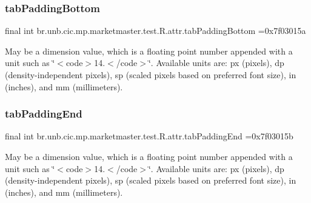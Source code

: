 \subsubsection{\texorpdfstring{tab\+Padding\+Bottom}{tabPaddingBottom}}
{\footnotesize\ttfamily final int br.\+unb.\+cic.\+mp.\+marketmaster.\+test.\+R.\+attr.\+tab\+Padding\+Bottom =0x7f03015a\hspace{0.3cm}{\ttfamily [static]}}

May be a dimension value, which is a floating point number appended with a unit such as \char`\"{}$<$code$>$14.\+5sp$<$/code$>$\char`\"{}. Available units are\+: px (pixels), dp (density-\/independent pixels), sp (scaled pixels based on preferred font size), in (inches), and mm (millimeters). \mbox{\label{classbr_1_1unb_1_1cic_1_1mp_1_1marketmaster_1_1test_1_1R_1_1attr_aaef9cca4dbdcb580ce7227e59b5d3ce3}} 
\subsubsection{\texorpdfstring{tab\+Padding\+End}{tabPaddingEnd}}
{\footnotesize\ttfamily final int br.\+unb.\+cic.\+mp.\+marketmaster.\+test.\+R.\+attr.\+tab\+Padding\+End =0x7f03015b\hspace{0.3cm}{\ttfamily [static]}}

May be a dimension value, which is a floating point number appended with a unit such as \char`\"{}$<$code$>$14.\+5sp$<$/code$>$\char`\"{}. Available units are\+: px (pixels), dp (density-\/independent pixels), sp (scaled pixels based on preferred font size), in (inches), and mm (millimeters). \mbox{\label{classbr_1_1unb_1_1cic_1_1mp_1_1marketmaster_1_1test_1_1R_1_1attr_a6ac840c5fcda5f3f2a13171bfa41af41}} 
